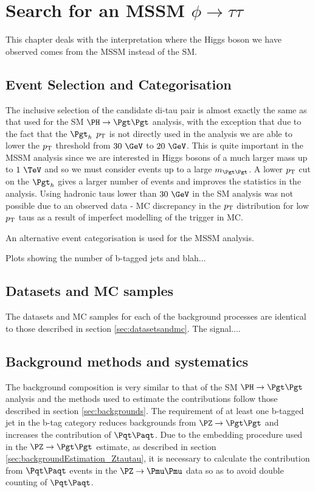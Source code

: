 \chapter{Search for an MSSM $\phi \rightarrow\tau\tau$}
\label{chap:httmssm}

This chapter deals with the interpretation where the Higgs boson we have
observed comes from the MSSM instead of the SM.


\section{Event Selection and Categorisation}

The inclusive selection of the candidate di-tau pair is almost exactly the same
as that used for the \ac{SM} $\HToTauTau$ analysis, with the exception that due
to the fact that the $\Pgth$ $p_{\mathrm{T}}$ is not directly used in the analysis we are
able to lower the $p_{\mathrm{T}}$ threshold from $30~\GeV$ to $20~\GeV$. This is quite
important in the \ac{MSSM} analysis since we are interested in Higgs bosons of a
much larger mass up to $1~\TeV$ and so we must consider events up to a large
$m_{\Pgt\Pgt}$. A lower $p_{\mathrm{T}}$ cut on the $\Pgth$ gives a larger number of events
and improves the statistics in the analysis. Using hadronic taus lower than
$30~\GeV$ in the \ac{SM} analysis was not possible due to an observed data -
\ac{MC} discrepancy in the $p_{\mathrm{T}}$ distribution for low $p_{\mathrm{T}}$ taus as a result of
imperfect modelling of the trigger in \ac{MC}.

An alternative event categorisation is used for the \ac{MSSM} analysis.


Plots showing the number of b-tagged jets and blah...


\section{Datasets and \ac{MC} samples}

The datasets and \ac{MC} samples for each of the background processes are
identical to those described in section \ref{sec:datasetsandmc}. The signal....


\section{Background methods and systematics}

The background composition is very similar to that of the \ac{SM} $\HToTauTau$
analysis and the methods used to estimate the contributions follow those
described in section \ref{sec:backgrounds}. The requirement of at least one
b-tagged jet in the b-tag category reduces backgrounds from $\ZToTauTau$
and increases the contribution of $\ttbar$. Due to the embedding procedure used
in the $\ZToTauTau$ estimate, as described in section
\ref{sec:backgroundEstimation_Ztautau}, it is necessary to calculate the
contribution from $\ttbar$ events in the $\PZ\to\Pmu\Pmu$ data so as to avoid
double counting of $\ttbar$.

